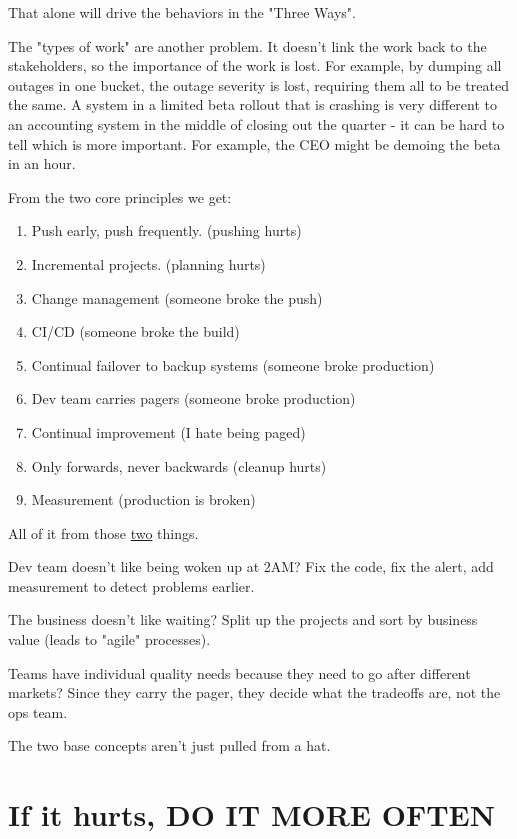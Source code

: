 \documentclass{article}
\begin{document}
That alone will drive the behaviors in the "Three Ways". 

The "types of work" are another problem. It doesn't link the work back to the stakeholders, so the importance of the work is lost. For example, by dumping all outages in one bucket, the outage severity is lost, requiring them all to be treated the same. A system in a limited beta rollout that is crashing is very different to an accounting system in the middle of closing out the quarter - it can be hard to tell which is more important. For example, the CEO might be demoing the beta in an hour.

From the two core principles we get:

\begin{enumerate}
	\item Push early, push frequently. (pushing hurts)
	\item Incremental projects. (planning hurts)
	\item Change management (someone broke the push)
	\item CI/CD (someone broke the build)
	\item Continual failover to backup systems (someone broke production)
	\item Dev team carries pagers (someone broke production)
	\item Continual improvement (I hate being paged)
	\item Only forwards, never backwards (cleanup hurts)
	\item Measurement (production is broken)
\end{enumerate}

All of it from those \underline{two} things. 

Dev team doesn't like being woken up at 2AM? Fix the code, fix the alert, add measurement to detect problems earlier.

The business doesn't like waiting? Split up the projects and sort by business value (leads to "agile" processes).

Teams have individual quality needs because they need to go after different markets? Since they carry the pager, they decide what the tradeoffs are, not the ops team.

The two base concepts aren't just pulled from a hat.

\section*{If it hurts, DO IT MORE OFTEN}
\end{document}

